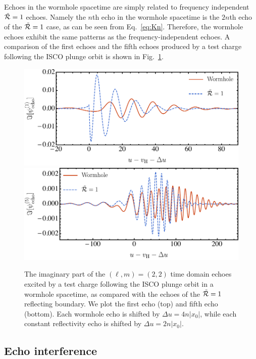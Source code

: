 \begin{refsection}
Echoes in the wormhole spacetime are simply related to frequency independent $\tilde{\mathcal R}=1$ echoes. Namely the $n$th echo in the wormhole spacetime is the $2n$th echo of the $\tilde{\mathcal R}=1$ case, as can be seen from Eq.~\eqref{eq:Kn}. 
Therefore, the wormhole echoes exhibit the same patterns as the frequency-independent echoes. A comparison of the first echoes and the fifth echoes produced by a test charge following the ISCO plunge orbit is shown in Fig.~\ref{fig:eccom}.

\begin{figure}[t]
\includegraphics[width = 1 \columnwidth]{chapter_echo/etc/Wormhole1TD.pdf} \\
\includegraphics[width = 1 \columnwidth]{chapter_echo/etc/Wormhole2TD.pdf}
\caption{
The imaginary part of the $(\ell,m)=(2,2)$ time domain echoes  excited by a test charge following the ISCO plunge orbit in a wormhole spacetime, as compared with the echoes of the $\tilde{\mathcal R}=1$ reflecting boundary. We plot the first echo (top) and fifth echo (bottom). Each wormhole echo is shifted by $\Delta u = 4 n |x_0|$, while each constant reflectivity echo is shifted by $\Delta u = 2 n |x_0|$.
}
\label{fig:eccom}
\end{figure}

\subsection{Echo interference}


\end{refsection}
